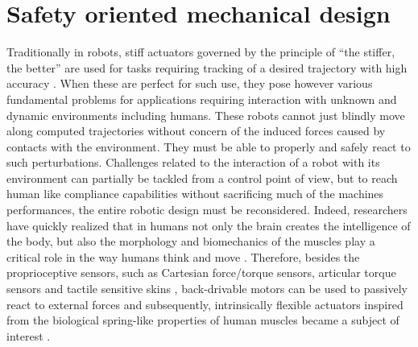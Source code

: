 \section[Safe mechanical design]{Safety oriented mechanical design}
Traditionally in robots, stiff actuators governed by the principle of ``the stiffer, the better'' are used for tasks requiring tracking of a desired trajectory with high accuracy \cite{salisbury1991design}. When these are perfect for such use, they pose however various fundamental problems for applications requiring interaction with unknown and dynamic environments including humans. These robots cannot just blindly move along computed trajectories without concern of the induced forces caused by contacts with the environment. They must be able to properly and safely react to such perturbations. Challenges related to the interaction of a robot with its environment can partially be tackled from a control point of view, but to reach human like compliance capabilities without sacrificing much of the machines performances, the entire robotic design must be reconsidered. Indeed, researchers have quickly realized that in humans not only the brain creates the intelligence of the body, but also the morphology and biomechanics of the muscles play a critical role in the way humans think and move \cite{pfeifer2006body}. Therefore, besides the proprioceptive sensors, such as Cartesian force/torque sensors, articular torque sensors and tactile sensitive skins \cite{Fogale-url}, back-drivable motors can be used to passively react to external forces \cite{townsend1993mechanical} and subsequently, intrinsically flexible actuators inspired from the biological spring-like properties of human muscles became a subject of interest \cite{burdet2001central}.  
